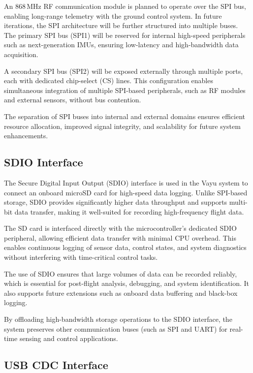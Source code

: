 An 868\,MHz RF communication module is planned to operate over the SPI bus, enabling long-range telemetry with the ground control system. In future iterations, the SPI architecture will be further structured into multiple buses. The primary SPI bus (SPI1) will be reserved for internal high-speed peripherals such as next-generation IMUs, ensuring low-latency and high-bandwidth data acquisition.

A secondary SPI bus (SPI2) will be exposed externally through multiple ports, each with dedicated chip-select (CS) lines. This configuration enables simultaneous integration of multiple SPI-based peripherals, such as RF modules and external sensors, without bus contention.

The separation of SPI buses into internal and external domains ensures efficient resource allocation, improved signal integrity, and scalability for future system enhancements.

\subsection{SDIO Interface}

The Secure Digital Input Output (SDIO) interface is used in the Vayu system to connect an onboard microSD card for high-speed data logging. Unlike SPI-based storage, SDIO provides significantly higher data throughput and supports multi-bit data transfer, making it well-suited for recording high-frequency flight data.

The SD card is interfaced directly with the microcontroller's dedicated SDIO peripheral, allowing efficient data transfer with minimal CPU overhead. This enables continuous logging of sensor data, control states, and system diagnostics without interfering with time-critical control tasks.

The use of SDIO ensures that large volumes of data can be recorded reliably, which is essential for post-flight analysis, debugging, and system identification. It also supports future extensions such as onboard data buffering and black-box logging.

By offloading high-bandwidth storage operations to the SDIO interface, the system preserves other communication buses (such as SPI and UART) for real-time sensing and control applications.

\subsection{USB CDC Interface}

